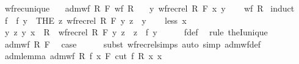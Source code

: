 \begin{isabellebody}
\isanewline
{}\isamarkupfalse%
\ wfrec{\isacharunderscore}{\kern0pt}unique{\isacharcolon}{\kern0pt}\isanewline
\ \ \ {\isachardoublequoteopen}adm{\isacharunderscore}{\kern0pt}wf\ R\ F{\isachardoublequoteclose}\ {\isachardoublequoteopen}wf\ R{\isachardoublequoteclose}\isanewline
\ \ \ {\isachardoublequoteopen}{\isasymexists}{\isacharbang}{\kern0pt}y{\isachardot}{\kern0pt}\ wfrec{\isacharunderscore}{\kern0pt}rel\ R\ F\ x\ y{\isachardoublequoteclose}\isanewline
%
\isadelimproof
\ \ %
\endisadelimproof
%
\isatagproof
{}\isamarkupfalse%
\ {\isacartoucheopen}wf\ R{\isacartoucheclose}\isanewline
{}\isamarkupfalse%
\ induct\isanewline
\ \ \isamarkupfalse%
\ f\ \ {\isachardoublequoteopen}f\ y\ {\isacharequal}{\kern0pt}\ {\isacharparenleft}{\kern0pt}THE\ z{\isachardot}{\kern0pt}\ wfrec{\isacharunderscore}{\kern0pt}rel\ R\ F\ y\ z{\isacharparenright}{\kern0pt}{\isachardoublequoteclose}\ \ y\isanewline
\ \ \isamarkupfalse%
\ {\isacharparenleft}{\kern0pt}less\ x{\isacharparenright}{\kern0pt}\isanewline
\ \ \isamarkupfalse%
\ \isamarkupfalse%
\ {\isachardoublequoteopen}{\isasymAnd}y\ z{\isachardot}{\kern0pt}\ {\isacharparenleft}{\kern0pt}y{\isacharcomma}{\kern0pt}\ x{\isacharparenright}{\kern0pt}\ {\isasymin}\ R\ {\isasymLongrightarrow}\ wfrec{\isacharunderscore}{\kern0pt}rel\ R\ F\ y\ z\ {\isasymlongleftrightarrow}\ z\ {\isacharequal}{\kern0pt}\ f\ y{\isachardoublequoteclose}\isanewline
\ \ \ \ \isamarkupfalse%
\ f{\isacharunderscore}{\kern0pt}def\ \isamarkupfalse%
\ {\isacharparenleft}{\kern0pt}rule\ theI{\isacharunderscore}{\kern0pt}unique{\isacharparenright}{\kern0pt}\isanewline
\ \ \isamarkupfalse%
\ {\isacartoucheopen}adm{\isacharunderscore}{\kern0pt}wf\ R\ F{\isacartoucheclose}\ \isamarkupfalse%
\ {\isacharquery}{\kern0pt}case\isanewline
\ \ \ \ \isamarkupfalse%
\ {\isacharparenleft}{\kern0pt}subst\ wfrec{\isacharunderscore}{\kern0pt}rel{\isachardot}{\kern0pt}simps{\isacharparenright}{\kern0pt}\ {\isacharparenleft}{\kern0pt}auto\ simp{\isacharcolon}{\kern0pt}\ adm{\isacharunderscore}{\kern0pt}wf{\isacharunderscore}{\kern0pt}def{\isacharparenright}{\kern0pt}\isanewline
{}\isamarkupfalse%
%
\endisatagproof
{\isafoldproof}%
%
\isadelimproof
\isanewline
%
\endisadelimproof
\isanewline
{}\isamarkupfalse%
\ adm{\isacharunderscore}{\kern0pt}lemma{\isacharcolon}{\kern0pt}\ {\isachardoublequoteopen}adm{\isacharunderscore}{\kern0pt}wf\ R\ {\isacharparenleft}{\kern0pt}{\isasymlambda}f\ x{\isachardot}{\kern0pt}\ F\ {\isacharparenleft}{\kern0pt}cut\ f\ R\ x{\isacharparenright}{\kern0pt}\ x{\isacharparenright}{\kern0pt}{\isachardoublequoteclose}\isanewline

\end{isabellebody}

